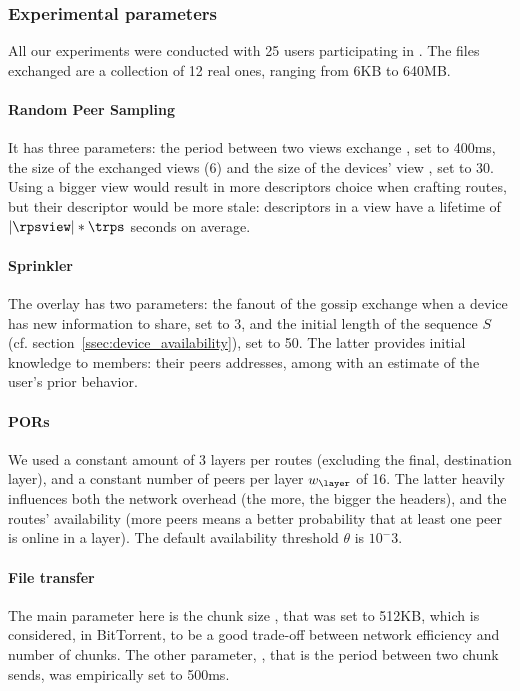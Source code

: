 \subsubsection{Experimental parameters} %
\label{ssub:experimental_parameters}

All our experiments were conducted with 25 users participating in \name. 
The files exchanged are a collection of 12 real ones, ranging from 6KB to 640MB.

\paragraph*{Random Peer Sampling} It has three parameters: the period between two views exchange \trps, set to 400ms, the size of the exchanged views (6) and the size of the devices' view \rpsview, set to 30. 
Using a bigger view would result in more descriptors choice when crafting routes, but their descriptor would be more stale: descriptors in a view have a lifetime of $|\rpsview| * \trps$ seconds on average.

\paragraph*{Sprinkler} The \squad overlay has two parameters: the fanout of the gossip exchange when a device has new information to share, set to 3, and the initial length of the sequence $S$ (cf. section~\ref{ssec:device_availability}), set to 50.
The latter provides initial knowledge to \squad members: their peers addresses, among with an estimate of the user's prior behavior.

\paragraph*{PORs} We used a constant amount of 3 layers per routes (excluding the final, destination layer),
and a constant number of peers per layer $w_\layer$ of 16.
The latter heavily influences both the network overhead (the more, the bigger the headers), and the routes' availability (more peers means a better probability that at least one peer is online in a layer).
The default availability threshold $\theta$ is $10^-3$.


\paragraph*{File transfer} The main parameter here is the chunk size \chunksize, that was set to 512KB, which is considered, in BitTorrent, to be a good trade-off between network efficiency and number of chunks.
The other parameter, \tupload, that is the period between two chunk sends, was empirically set to 500ms.


